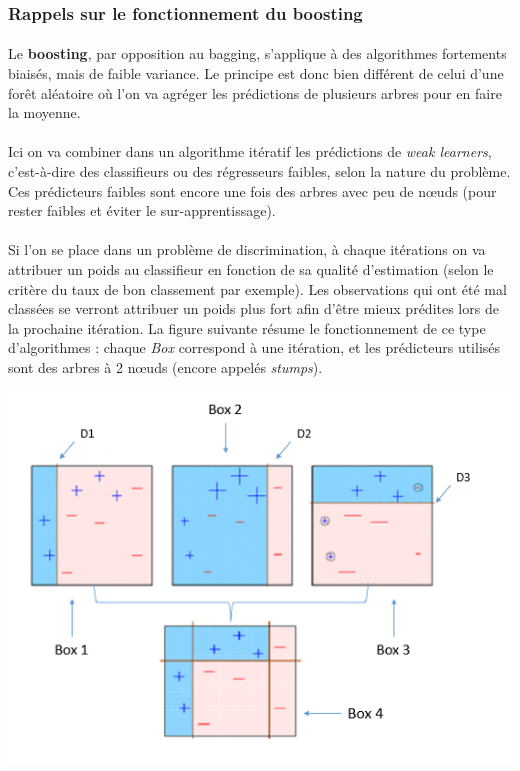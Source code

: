 \documentclass[14pt, openany]{article}
\begin{document}
\subsubsection{Rappels sur le fonctionnement du boosting}
\paragraph{}
Le \textbf{boosting}, par opposition au bagging, s'applique à des algorithmes fortements biaisés, mais de faible variance. Le principe est donc bien différent de celui d'une forêt aléatoire où l'on va agréger les prédictions de plusieurs arbres pour en faire la moyenne.
\paragraph{}
Ici on va combiner dans un algorithme itératif les prédictions de \textit{weak learners}, c'est-à-dire des classifieurs ou des régresseurs faibles, selon la nature du problème. Ces prédicteurs faibles sont encore une fois des arbres avec peu de nœuds (pour rester faibles et éviter le sur-apprentissage). 
\paragraph{}
Si l'on se place dans un problème de discrimination, à chaque itérations on va attribuer un poids au classifieur en fonction de sa qualité d'estimation (selon le critère du taux de bon classement par exemple). Les observations qui ont été mal classées se verront attribuer un poids plus fort afin d'être mieux prédites lors de la prochaine itération. La figure suivante résume le fonctionnement de ce type d'algorithmes : chaque \textit{Box} correspond à une itération, et les prédicteurs utilisés sont des arbres à 2 nœuds (encore appelés \textit{stumps}).

\includegraphics[width=19cm]{Images/boosting.png}
\begin{center}
\end{center}
\end{document}
